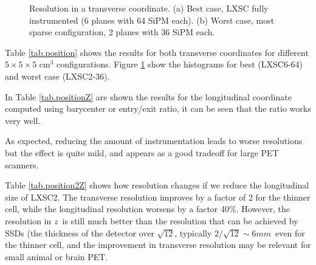 \begin{figure}[!htb]
	\centering
	\caption{\label{fig.xBest} Resolution in a transverse coordinate. (a) Best case, LXSC fully instrumented (6 planes with 64 SiPM each). (b) Worst case, most sparse configuration, 2 planes with 36 SiPM each.}
\end{figure}


Table \ref{tab.position} shows the results for both transverse coordinates for different $5\times5\times5$ cm$^3$ configurations. Figure \ref{fig.xBest} show the histograms for best (LXSC6-64) and worst case (LXSC2-36).

In Table \ref{tab.positionZ} are shown the results for the longitudinal coordinate computed using barycenter or entry/exit ratio, it can be seen that the ratio works very well. 

As expected, reducing the amount of instrumentation leads to worse resolutions but the effect is quite mild, and appears as a good tradeoff for large PET scanners.  

Table \ref{tab.position2Z} shows how resolution changes if we reduce the longitudinal size of LXSC2. The transverse resolution improves by a factor of 2 for the thinner cell, while the longitudinal resolution worsens by a factor 40\%. However, the resolution in $z$~is still much better than the resolution that can be achieved by SSDs (the thickness of the detector over $\sqrt{12}$, typically $2/\sqrt{12} \sim 6 mm$~even for the thinner cell, and the improvement in transverse resolution may be relevant for small animal or brain PET. 

